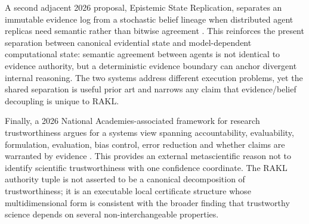 A second adjacent 2026 proposal, Epistemic State Replication, separates an immutable evidence log from a stochastic belief lineage when distributed agent replicas need semantic rather than bitwise agreement \cite{heyu2026esr}. This reinforces the present separation between canonical evidential state and model-dependent computational state: semantic agreement between agents is not identical to evidence authority, but a deterministic evidence boundary can anchor divergent internal reasoning. The two systems address different execution problems, yet the shared separation is useful prior art and narrows any claim that evidence/belief decoupling is unique to RAKL.

Finally, a 2026 National Academies-associated framework for research trustworthiness argues for a systems view spanning accountability, evaluability, formulation, evaluation, bias control, error reduction and whether claims are warranted by evidence \cite{nosek2026trust}. This provides an external metascientific reason not to identify scientific trustworthiness with one confidence coordinate. The RAKL authority tuple is not asserted to be a canonical decomposition of trustworthiness; it is an executable local certificate structure whose multidimensional form is consistent with the broader finding that trustworthy science depends on several non-interchangeable properties.
